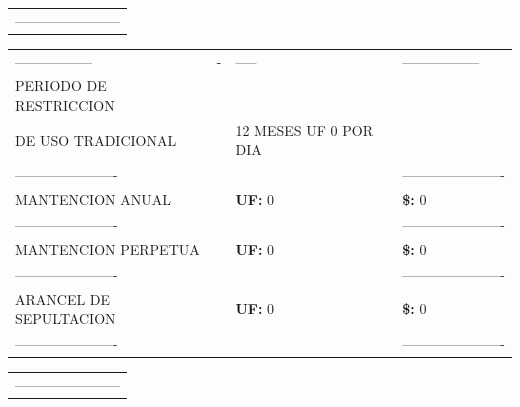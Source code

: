 \documentclass[10pt]{article}
\begin{document}
\begin{tabular}{l}
\color{white}----------------------- \\
\end{tabular}

\begin{tabular}{llll}
\hline
\color{white}----------------- & \color{white}- & \color{white}-----  & \color{white}----------------- \\
PERIODO DE RESTRICCION & & &\\ 
DE USO TRADICIONAL  & & 12 MESES UF 0 POR DIA \\ 
\color{white}---------------------- & & & \color{white}---------------------- \\
MANTENCION ANUAL &  & \textbf{UF: }0& \textbf{\$: }0 \\  
\color{white}---------------------- & & & \color{white}---------------------- \\
MANTENCION PERPETUA &  & \textbf{UF: }0 & \textbf{\$: }0 \\  
\color{white}---------------------- & & & \color{white}---------------------- \\
ARANCEL DE SEPULTACION &  & \textbf{UF: } 0& \textbf{\$: } 0 \\  
\color{white}---------------------- & & & \color{white}---------------------- \\
\hline
\end{tabular}

\begin{tabular}{l}
\color{white}----------------------- \\
\end{tabular}
\end{document}
